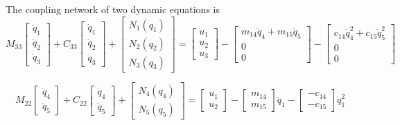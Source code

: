 The coupling network of two dynamic equations is
\[
M_{33}\left[\begin{array}{c}
\ddot{q}_{1}\\
\ddot{q}_{2}\\
\ddot{q}_{3}\end{array}\right]+C_{33}\left[\begin{array}{c}
\dot{q}_{1}\\
\dot{q}_{2}\\
\dot{q}_{3}\end{array}\right]+\left[\begin{array}{c}
N_{1}(q_{1})\\
N_{2}(q_{2})\\
N_{3}(q_{3})\end{array}\right]=\left[\begin{array}{c}
u_{1}\\
u_{2}\\
u_{3}\end{array}\right]-\left[\begin{array}{c}
m_{14}\ddot{q}_{4}+m_{15}\ddot{q}_{5}\\
0\\
0\end{array}\right]-\left[\begin{array}{c}
c_{14}\dot{q}_{4}^{2}+c_{15}\dot{q}_{5}^{2}\\
0\\
0\end{array}\right]
\]

\[
M_{22}\left[\begin{array}{c}
\ddot{q}_{4}\\
\ddot{q}_{5}\end{array}\right]+C_{22}\left[\begin{array}{c}
\dot{q}_{4}\\
\dot{q}_{5}\end{array}\right]+\left[\begin{array}{c}
N_{4}(q_{4})\\
N_{5}(q_{5})\end{array}\right]=\left[\begin{array}{c}
u_{1}\\
u_{2}\end{array}\right]-\left[\begin{array}{c}
m_{14}\\
m_{15}\end{array}\right]\ddot{q}_{1}-\left[\begin{array}{c}
-c_{14}\\
-c_{15}\end{array}\right]\dot{q}_{1}^{2}
\]

